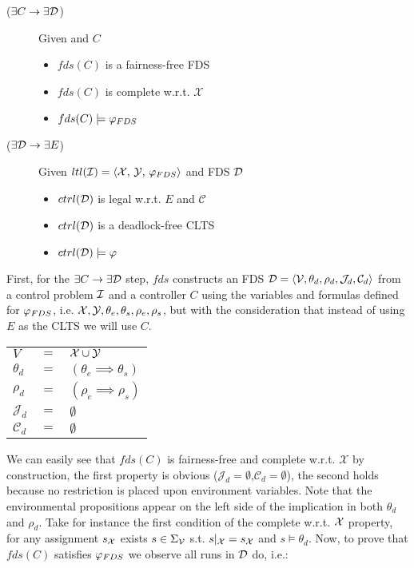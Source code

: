 \begin{description}
	\item[($\exists C \rightarrow \exists \mathcal{D}$)] Given \controlProblemDef and $C$
		\begin{itemize}
			\item $fds(C)$ is a fairness-free FDS			
			\item $fds(C)$ is complete w.r.t. $\mathcal{X}$
			\item $fds(C) \models \varphi_{FDS}$
		\end{itemize}
	\item[($\exists \mathcal{D} \rightarrow \exists E$)] Given $\fdsEmbeddingDef$ and FDS $\mathcal{D}$
		\begin{itemize}
			\item $ctrl(\mathcal{D})$ is legal w.r.t. $E$ and $\mathcal{C}$
			\item $ctrl(\mathcal{D})$ is a deadlock-free CLTS			
			\item $ctrl(\mathcal{D}) \models \varphi$
		\end{itemize}	
\end{description}

First,  for the $\exists C \rightarrow \exists \mathcal{D}$ step, $fds$ constructs an FDS $\mathcal{D}=\langle \mathcal V, \theta_d, \rho_d, \mathcal{J}_d, \mathcal{C}_d \rangle$ from a control problem $\mathcal{I}$ and a controller $C$ using the variables and formulas defined for $\varphi_{FDS}$, i.e. ${\mathcal{X}}, {\mathcal{Y}}, {\theta_e}, {\theta_s}, {\rho_e}, {\rho_s}$, but with the consideration that instead of using $E$ as the CLTS we will use $C$.

\begin{tabular}{ l c l }
	$V$ & $=$ & ${\mathcal{X}} \cup {\mathcal{Y}}$\\	
	$\theta_d$ & $=$ & $(\theta_e \implies \theta_s)$\\
	$\rho_d$ & $=$ & $(\rho_e \implies \rho_s)$\\	
	$\mathcal{J}_d$ & $=$ & $\emptyset$\\
	$\mathcal{C}_d$ & $=$ & $\emptyset$\\
\end{tabular}

We can easily see that $fds(C)$ is fairness-free and complete w.r.t. $\mathcal{X}$ by construction, the first property is obvious ($\mathcal{J}_d=\emptyset$,$\mathcal{C}_d=\emptyset$), the second holds because no restriction is placed upon environment variables. Note that the environmental propositions appear on the left side of the implication in both $\theta_d$ and $\rho_d$. Take for instance the first condition of the complete w.r.t. ${\mathcal{X}}$ property, for any assignment $s_{{\mathcal{X}}}$ exists $s \in \Sigma_{{\mathcal{V}}}$ s.t. $s|_{{\mathcal{X}}}=s_{{\mathcal{X}}}$ and $s \models \theta_d$. Now, to prove that $fds(C)$ satisfies $\varphi_{FDS}$ we observe all runs in $\mathcal{D}$ do, i.e.: 

